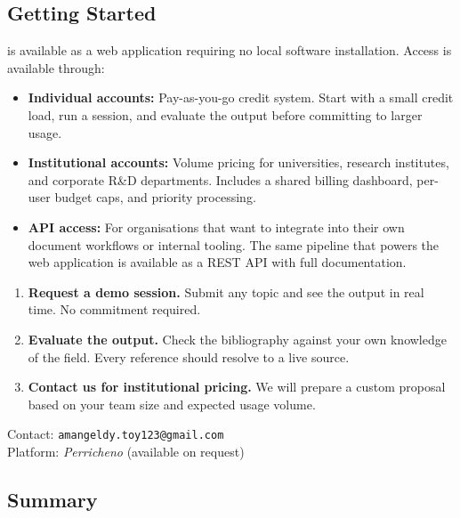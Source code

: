 \subsection{Getting Started}

\sys{} is available as a web application requiring no local software installation.
Access is available through:

\begin{itemize}
  \item \textbf{Individual accounts:} Pay-as-you-go credit system.
        Start with a small credit load, run a session, and evaluate the output
        before committing to larger usage.
  \item \textbf{Institutional accounts:} Volume pricing for universities,
        research institutes, and corporate R\&D departments.
        Includes a shared billing dashboard, per-user budget caps,
        and priority processing.
  \item \textbf{API access:} For organisations that want to integrate
        \sys{} into their own document workflows or internal tooling.
        The same pipeline that powers the web application is available
        as a REST API with full documentation.
\end{itemize}

\begin{keybox}[title=Next Steps]
\begin{enumerate}[noitemsep]
  \item \textbf{Request a demo session.}
        Submit any topic and see the output in real time.
        No commitment required.
  \item \textbf{Evaluate the output.}
        Check the bibliography against your own knowledge of the field.
        Every reference should resolve to a live source.
  \item \textbf{Contact us for institutional pricing.}
        We will prepare a custom proposal based on your team size and
        expected usage volume.
\end{enumerate}
\vspace{0.3em}
Contact: \texttt{amangeldy.toy123@gmail.com}\\
Platform: \textit{Perricheno} (available on request)
\end{keybox}

\subsection{Summary}

